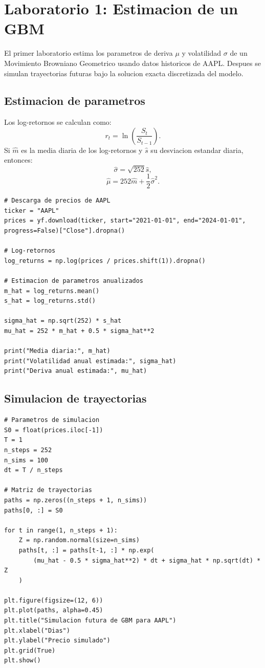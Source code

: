 \documentclass[12pt,a4paper]{article}
\begin{document}
\section{Laboratorio 1: Estimacion de un GBM}

\begin{markdowncell}
El primer laboratorio estima los parametros de deriva \(\mu\) y volatilidad \(\sigma\) de un Movimiento Browniano Geometrico usando datos historicos de AAPL. Despues se simulan trayectorias futuras bajo la solucion exacta discretizada del modelo.
\end{markdowncell}

\subsection{Estimacion de parametros}

\begin{latexcell}
Los log-retornos se calculan como:
\[
r_t = \ln\left(\frac{S_t}{S_{t-1}}\right).
\]
Si \(\hat{m}\) es la media diaria de los log-retornos y \(\hat{s}\) su desviacion estandar diaria, entonces:
\[
\hat{\sigma}=\sqrt{252}\hat{s},
\]
\[
\hat{\mu}=252\hat{m}+\frac{1}{2}\hat{\sigma}^2.
\]
\end{latexcell}

\begin{lstlisting}[style=pythonstyle]
# Descarga de precios de AAPL
ticker = "AAPL"
prices = yf.download(ticker, start="2021-01-01", end="2024-01-01", progress=False)["Close"].dropna()

# Log-retornos
log_returns = np.log(prices / prices.shift(1)).dropna()

# Estimacion de parametros anualizados
m_hat = log_returns.mean()
s_hat = log_returns.std()

sigma_hat = np.sqrt(252) * s_hat
mu_hat = 252 * m_hat + 0.5 * sigma_hat**2

print("Media diaria:", m_hat)
print("Volatilidad anual estimada:", sigma_hat)
print("Deriva anual estimada:", mu_hat)
\end{lstlisting}

\subsection{Simulacion de trayectorias}

\begin{lstlisting}[style=pythonstyle]
# Parametros de simulacion
S0 = float(prices.iloc[-1])
T = 1
n_steps = 252
n_sims = 100
dt = T / n_steps

# Matriz de trayectorias
paths = np.zeros((n_steps + 1, n_sims))
paths[0, :] = S0

for t in range(1, n_steps + 1):
    Z = np.random.normal(size=n_sims)
    paths[t, :] = paths[t-1, :] * np.exp(
        (mu_hat - 0.5 * sigma_hat**2) * dt + sigma_hat * np.sqrt(dt) * Z
    )

plt.figure(figsize=(12, 6))
plt.plot(paths, alpha=0.45)
plt.title("Simulacion futura de GBM para AAPL")
plt.xlabel("Dias")
plt.ylabel("Precio simulado")
plt.grid(True)
plt.show()
\end{lstlisting}
\end{document}
